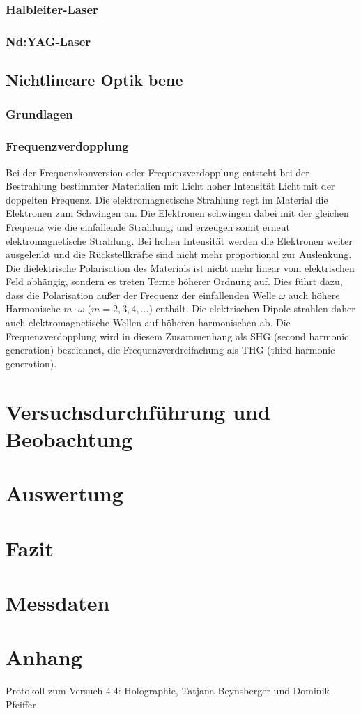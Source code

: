 \documentclass[twoside,colorback,accentcolor=tud4c,11pt]{tudreport}
\begin{document}
\subsection{Halbleiter-Laser}
\subsection{Nd:YAG-Laser}
\section{Nichtlineare Optik bene}
\subsection{Grundlagen}
\subsection{Frequenzverdopplung}
Bei der Frequenzkonversion oder Frequenzverdopplung entsteht bei der Bestrahlung bestimmter Materialien mit Licht hoher Intensität Licht mit der doppelten Frequenz. Die elektromagnetische Strahlung regt im Material die Elektronen zum Schwingen an. Die Elektronen schwingen dabei mit der gleichen Frequenz wie die einfallende Strahlung, und erzeugen somit erneut elektromagnetische Strahlung. Bei hohen Intensität werden die Elektronen weiter ausgelenkt und die Rückstellkräfte sind nicht mehr proportional zur Auslenkung. Die dielektrische Polarisation des Materials ist nicht mehr linear vom elektrischen Feld abhängig, sondern es treten Terme höherer Ordnung auf. Dies führt dazu, dass die Polarisation außer der Frequenz der einfallenden Welle $\omega$ auch höhere Harmonische $m\cdot \omega$ ($m=2,3,4,...$) enthält. Die elektrischen Dipole strahlen daher auch elektromagnetische Wellen auf höheren harmonischen ab. Die Frequenzverdopplung wird in diesem Zusammenhang als SHG (second harmonic generation) bezeichnet, die Frequenzverdreifachung als THG (third harmonic generation).	
\chapter{Versuchsdurchführung und Beobachtung}
  
     	
\chapter{Auswertung}
\chapter{Fazit}
\chapter{Messdaten}


\chapter{Anhang}





		

\renewcommand{\bibname}{Literaturverzeichnis}
\begin{thebibliography}{0}
 Protokoll zum Versuch 4.4: Holographie, Tatjana Beynsberger und Dominik Pfeiffer 
\bibitem {}
\bibitem {}
\end{thebibliography} 	
\end{document}
